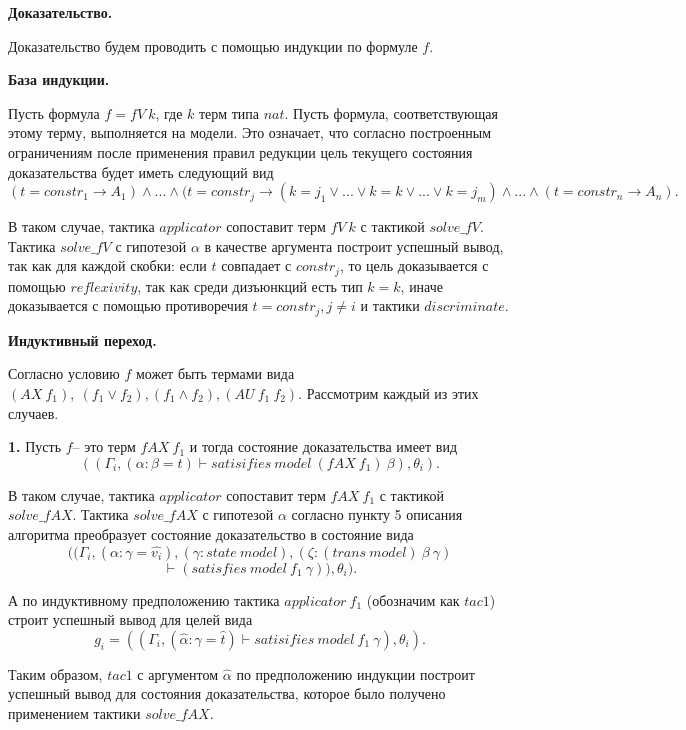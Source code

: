 \documentclass[12pt]{article}
\begin{document}
\textbf{Доказательство.}

Доказательство будем проводить с помощью индукции по формуле $f$.

\textbf{База индукции.}

Пусть формула $f = fV\ k$, где $k$ терм типа $nat$. Пусть формула, соответствующая этому терму, выполняется на модели. Это означает, что согласно построенным ограничениям после применения правил редукции цель текущего состояния доказательства будет иметь следующий вид 
$$(t=constr_1 \xrightarrow{} A_1) \wedge ... \wedge (t=constr_j \xrightarrow{} (k=j_{1} \vee ...\vee k=k \vee ...\vee k=j_{m}) \wedge ... \wedge(t=constr_n \xrightarrow{} A_n).$$


В таком случае, тактика $applicator$ сопоставит терм $fV\ k$ с тактикой $solve\_fV$. Тактика $solve\_fV$ с гипотезой $\alpha$ в качестве аргумента построит успешный вывод, так как для каждой скобки: если $t$ совпадает с $constr_j$, то цель доказывается с помощью $reflexivity$, так как среди дизъюнкций есть тип $k=k$, иначе доказывается с помощью противоречия $t=constr_j, j \neq i$ и тактики $discriminate$.

\textbf{Индуктивный переход.}

Согласно условию $f$ может быть термами вида $(AX\ f_1),\ (f_1 \vee f_2),(f_1 \wedge f_2), (AU\ f_1 \ f_2).$ Рассмотрим каждый из этих случаев.

\textbf{1.} Пусть $f$-- это терм $fAX\ f_1$ и тогда состояние доказательства имеет вид 
$$((\Gamma_i, (\alpha: \beta=t) \vdash satisifies\ model\ (fAX\ f_1)\ \beta), \theta_i).$$


В таком случае, тактика $applicator$ сопоставит терм $fAX\ f_1$ с тактикой $solve\_fAX$. 
Тактика $solve\_fAX$ с гипотезой $\alpha$ согласно пункту 5 описания алгоритма преобразует состояние  доказательство в состояние вида
$$((\Gamma_i, (\alpha: \gamma=\hat{v_{i}}), (\gamma: state\ model), (\zeta: (trans\  model)\ \beta\ \gamma ) $$
    $$\vdash (satisfies\ model\ f_1\ \gamma)), \theta_i).$$

А по индуктивному предположению тактика $applicator\ f_1$ (обозначим как $tac1$) строит успешный вывод для целей вида $$g_i = ((\Gamma_i, (\hat{\alpha}: \gamma=\hat{t}) \vdash satisifies\ model\ f_1\ \gamma), \theta_i).$$

Таким образом, $tac1$ с аргументом $\hat{\alpha}$ по предположению индукции построит успешный вывод для состояния доказательства, которое было получено применением тактики $solve\_fAX$.
\end{document}
